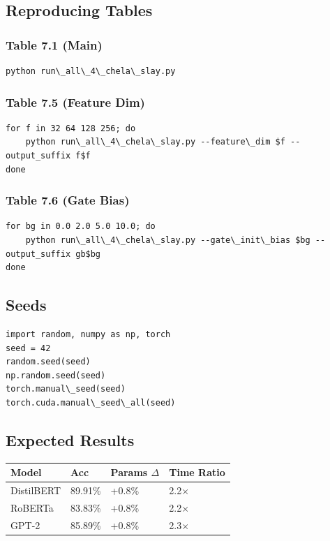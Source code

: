 \subsection{Reproducing Tables}

\subsubsection{Table 7.1 (Main)}
\begin{lstlisting}
python run\_all\_4\_chela\_slay.py
\end{lstlisting}

\subsubsection{Table 7.5 (Feature Dim)}
\begin{lstlisting}
for f in 32 64 128 256; do
    python run\_all\_4\_chela\_slay.py --feature\_dim $f --output_suffix f$f
done
\end{lstlisting}

\subsubsection{Table 7.6 (Gate Bias)}
\begin{lstlisting}
for bg in 0.0 2.0 5.0 10.0; do
    python run\_all\_4\_chela\_slay.py --gate\_init\_bias $bg --output_suffix gb$bg
done
\end{lstlisting}

\subsection{Seeds}

\begin{lstlisting}
import random, numpy as np, torch
seed = 42
random.seed(seed)
np.random.seed(seed)
torch.manual\_seed(seed)
torch.cuda.manual\_seed\_all(seed)
\end{lstlisting}

\subsection{Expected Results}

\begin{table}[H]
\centering
\small
\begin{tabular}{llll}
\toprule
\textbf{Model} & \textbf{Acc} & \textbf{Params $\Delta$} & \textbf{Time Ratio} \\
\midrule
DistilBERT & 89.91\% & +0.8\% & 2.2$\times$ \\
RoBERTa & 83.83\% & +0.8\% & 2.2$\times$ \\
GPT-2 & 85.89\% & +0.8\% & 2.3$\times$ \\
\bottomrule
\end{tabular}
\end{table}

